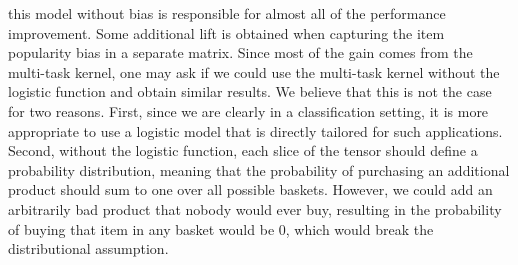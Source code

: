 this model without bias is responsible for almost all of the performance
improvement.  Some additional lift is obtained when capturing the item
popularity bias in a separate matrix. Since most of the gain comes from the
multi-task kernel, one may ask if we could use the multi-task kernel without the
logistic function and obtain similar results. We believe that this is not the
case for two reasons. First, since we are clearly in a classification setting,
it is more appropriate to use a logistic model that is directly tailored for
such applications. Second, without the logistic function, each slice of the
tensor should define a probability distribution, meaning that the probability of
purchasing an additional product should sum to one over all possible baskets.
However, we could add an arbitrarily bad product that nobody would ever buy,
resulting in the probability of buying that item in any basket would be $0$,
which would break the distributional assumption. 

